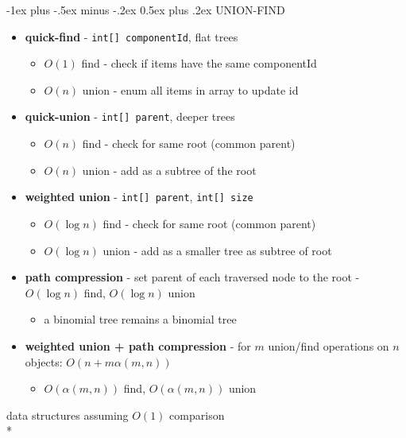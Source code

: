 \documentclass[10pt]{article}
\makeatletter
\newenvironment{tightcenter}{%
  \setlength\topsep{0pt}
  \setlength\parskip{0pt}
  \begin{center}
}{%
  \end{center}
}
\renewcommand{\section}{\@startsection{section}{1}{0mm}%
                                {-1ex plus -.5ex minus -.2ex}%
                                {0.5ex plus .2ex}%
                                {\normalfont\large\bfseries}}
\newcommand{\code}[1]{\textcolor{mygreen}{\texttt{#1}}}
\makeatother
\begin{document}
\begin{multicols}{3}
\section{UNION-FIND}
\begin{itemize}
    \item \textbf{quick-find} - \code{int[] componentId}, flat trees
    \begin{itemize}
        \item $O(1)$ find - check if items have the same componentId
        \item $O(n)$ union - enum all items in array to update id
    \end{itemize}
    \item \textbf{quick-union} - \code{int[] parent}, deeper trees
    \begin{itemize}
        \item $O(n)$ find - check for same root (common parent)
        \item $O(n)$ union - add as a subtree of the root
    \end{itemize}
    \item \textbf{weighted union} - \code{int[] parent}, \code{int[] size}
    \begin{itemize}
        \item $O(\log n)$ find - check for same root (common parent)
        \item $O(\log n)$ union - add as a smaller tree as subtree of root
    \end{itemize}
    \item \textbf{path compression} - set parent of each traversed node to the root - $O(\log n)$ find, $O(\log n)$ union
    \begin{itemize}
        \item a binomial tree remains a binomial tree
    \end{itemize}
    \item \textbf{weighted union + path compression} - for $m$ union/find operations on $n$ objects: $O(n + m\alpha (m, n))$
    \begin{itemize}
        \item $O(\alpha (m, n))$ find, $O(\alpha (m, n))$ union
    \end{itemize}
\end{itemize}
\begin{tightcenter}
    data structures assuming $O(1)$ comparison 
\\* \begin{tabular}{| c | c | c |}\hline

\end{tabular}
\end{tightcenter}
\end{multicols}
\end{document}
